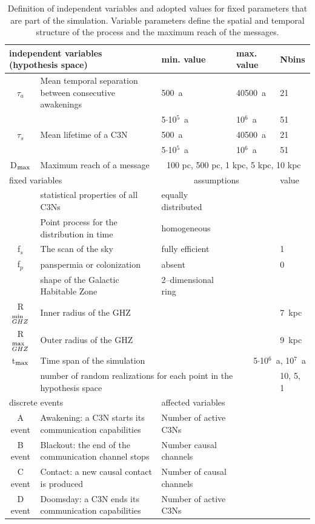 \documentclass[crop]{CSLB}
\newcommand{\ceti}{C3N}
\newcommand{\cetis}{C3Ns}
\begin{document}
 \setlength{\tabcolsep}{10pt}
\begin{table}
\centering
\begin{tabular}{cllll}
\hline
   \multicolumn{2}{l}{independent variables (hypothesis space)}
   &min. value&max. value&Nbins\\
\hline
   $\tau_{a}$ & Mean temporal separation between consecutive awakenings 
	      & 500~a & 40500~a & 21\\ 
	    & & 5$\cdot$10$^5$~a & 10$^6$~a & 51\\ 
   $\tau_{s}$ & Mean lifetime of a \ceti{}
	      & 500~a & 40500~a & 21\\ 
	    & & 5$\cdot$10$^5$~a & 10$^6$~a & 51\\ 
	D$_{\rm max}$ & Maximum reach of a message  & \multicolumn{3}{c}{100 pc, 500 pc, 1 kpc, 5 kpc, 10 kpc} \\
\hline
   \multicolumn{2}{l}{fixed variables} & \multicolumn{2}{c}{assumptions} &value \\
\hline
   & statistical properties of all \cetis{} &equally distributed&&\\
   & Point process for the distribution in time & homogeneous &&\\
   f$_s$ & The scan of the sky & fully efficient&&1\\
   f$_p$ & panspermia or colonization &absent&&0\\
   & shape of the Galactic Habitable Zone & 2--dimensional ring &&\\
	R$_{GHZ}^{\rm min}$   & Inner radius of the GHZ  & \citet{lineweaver_galactic_2004} & & 7~kpc\\
   R$_{GHZ}^{\rm max}$   & Outer radius of the GHZ       & \citet{lineweaver_galactic_2004} & & 9~kpc\\
	t$_{\rm max}$ & Time span of the simulation  & & \multicolumn{2}{r}{5$\cdot$10$^6$~a, 10$^7$~a} \\
    & \multicolumn{3}{l}{number of random realizations for each point in the hypothesis space} & 10, 5, 1 \\
\hline
   \multicolumn{2}{l}{discrete events} &
   \multicolumn{3}{l}{affected variables}\\
\hline
   A event & Awakening: a \ceti{} starts its communication
   capabilities &Number of active \cetis{}\\
   B event & Blackout: the end of the communication channel stops
   &Number causal channels\\
   C event & Contact: a new causal contact is produced &Number of causal channels\\
   D event & Doomsday: a \ceti{} ends its communication capabilities&Number of active \cetis{}\\
\hline

\hline
\end{tabular}
\caption{Definition of independent variables and adopted values for 
   fixed parameters 
   that are part of the simulation.  Variable parameters define the
   spatial and temporal structure
   of the process and the maximum reach of the messages.}
\label{T_simu_hypotheses}
\end{table}
 
\end{document}
